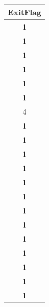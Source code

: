 \begin{tiny}\begin{tabular}{|c|}
\hline
\textbf{ExitFlag}\\\hline
1\\\hline
1\\\hline
1\\\hline
1\\\hline
1\\\hline
1\\\hline
4\\\hline
1\\\hline
1\\\hline
1\\\hline
1\\\hline
1\\\hline
1\\\hline
1\\\hline
1\\\hline
1\\\hline
1\\\hline
1\\\hline
1\\\hline
1\\\hline
\end{tabular}
\end{tiny}